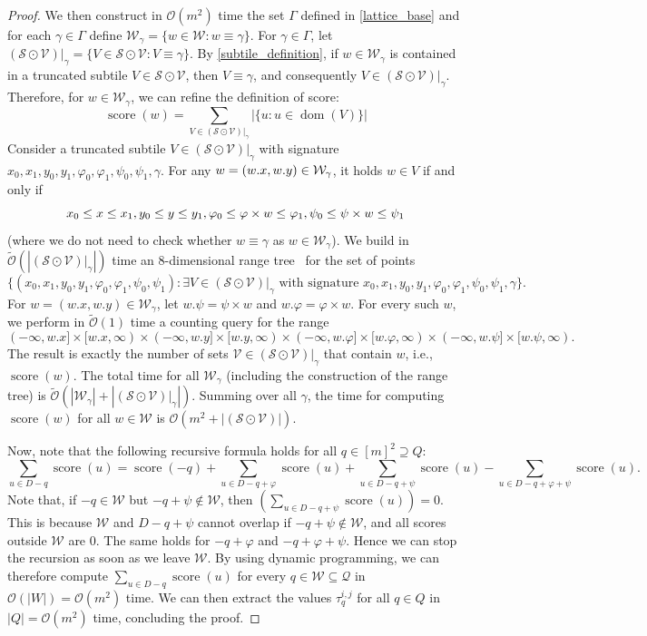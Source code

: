 \documentclass[twoside,leqno]{article}
\let\Cref\cref
\renewcommand{\O}{\mathcal{O}}
\newcommand{\tO}{\tilde{\mathcal{O}}}
\newcommand{\Q}{\mathcal{Q}}
\renewcommand{\S}{\mathcal{S}}
\newcommand{\V}{\mathcal{V}}
\newcommand{\W}{\mathcal{W}}
\renewcommand{\phi}{\varphi}
\DeclareMathOperator*{\score}{score}
\DeclareMathOperator*{\dom}{dom}
\newcommand{\absolute}[1]{\left\lvert#1\right\rvert}
\begin{document}
\begin{proof}
We then construct in $\O(m^2)$ time the set $\Gamma$ defined in \Cref{lattice_base} and for each $\gamma \in \Gamma$ define $\W_\gamma = \{w \in \W : w \equiv \gamma\}$. For $\gamma \in \Gamma$, let $(\S \odot \V) |_\gamma = \{V \in \S \odot \V : V \equiv \gamma\}$. 
By \cref{subtile_definition}, if $w \in \W_\gamma$ is contained in a truncated subtile $V \in \S \odot \V$, then $V \equiv \gamma$, and consequently $V \in (\S \odot \V) |_\gamma$. Therefore, for $w \in \W_\gamma$, we can refine the definition of score:
%
$$\score(w) = \sum_{V \in (\S \odot \V) |_\gamma} \absolute{\{u : u \in \dom(V)\}}$$
%
Consider a truncated subtile $V \in (\S \odot \V) |_\gamma$ with signature $x_0, x_1, y_0, y_1, \phi_0, \phi_1, \psi_0, \psi_1, \gamma$. For any $w = (\x{w}, \y{w}) \in \W_\gamma$, it holds $w \in V$ if and only if
\begin{equation}
\label{eq:range}
x_0 \le x \le x_1, y_0 \le y \le y_1, \phi_0 \le \h{w} \le \phi_1, \psi_0 \le \s{w} \le \psi_1
\end{equation}
(where we do not need to check whether $w \equiv \gamma$ as $w \in \W_\gamma$). We build in $\tO(\absolute{(\S \odot \V) |_\gamma})$ time an $8$-dimensional range tree~\cite{BENTLEY1979244} for the set of points 
%
$$\{(x_0, x_1, y_0, y_1, \phi_0, \phi_1, \psi_0, \psi_1) : \exists V \in (\S \odot \V) |_\gamma\text{\ with signature\ } x_0, x_1, y_0, y_1, \phi_0, \phi_1, \psi_0, \psi_1, \gamma\}.$$
For $w = (w.x, w.y) \in \W_\gamma$, let $w.\psi = \psi \times w$ and $w.\phi = \phi \times w$. For every such $w$, we perform in $\tO(1)$ time a counting query for the range 
$$
(-\infty, w.x] \times [w.x, \infty) \times 
(-\infty, w.y] \times [w.y, \infty) \times
(-\infty, w.\phi] \times [w.\phi, \infty) \times
(-\infty, w.\psi] \times [w.\psi, \infty).
$$
The result is exactly the number of sets $\V \in (\S \odot \V) |_\gamma$ that contain $w$, i.e., $\score(w)$. The total time for all $\W_\gamma$ (including the construction of the range tree) is $\tO(\absolute{\W_\gamma} + \absolute{(\S \odot \V) |_\gamma})$. Summing over all $\gamma$, the time for computing $\score(w)$ for all $w \in \W$ is $\O(m^2 + \absolute{(\S \odot \V)})$.

Now, note that the following recursive formula holds for all $q \in [m]^2 \supseteq Q$:
%
$$\sum_{u \in D-q} \score(u) = \score(-q) + \sum_{u \in D-q+\phi} \score(u) + \sum_{u \in D-q+\psi} \score(u) -\sum_{u \in D-q+\phi+\psi} \score(u).$$
%
Note that, if $-q \in \W$ but $-q + \psi \notin \W$, then $(\sum_{u \in D-q+\psi} \score(u)) = 0$. This is because $\W$ and $D -q + \psi$ cannot overlap if $-q + \psi \notin \W$, and all scores outside $\W$ are $0$. The same holds for $-q + \phi$ and $-q + \phi + \psi$. Hence we can stop the recursion as soon as we leave $\W$. By using dynamic programming, we can therefore compute $\sum_{u \in D-q} \score(u)$ for every $q \in\W \subseteq \Q$ in $\O(\absolute{W}) = \O(m^2)$ time. 
We can then extract the values $\tau^{i,j}_q$ for all $q \in Q$ in $\absolute{Q} = \O(m^2)$ time, concluding the proof. 
\end{proof}
	
\end{document}
